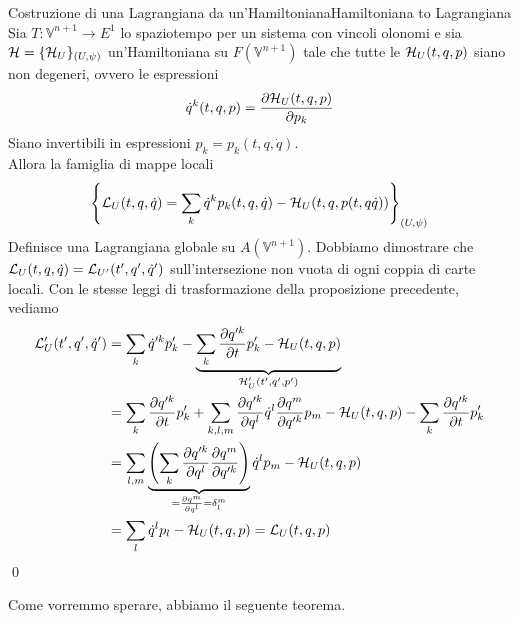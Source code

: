 \documentclass[openany]{book}
\renewcommand\V{\mathbb{V}}
\begin{document}
\begin{proposition}{Costruzione di una Lagrangiana da un'Hamiltoniana}{Hamiltoniana to Lagrangiana}
    Sia $T:\V^{n+1}\to E^1$ lo spaziotempo per un sistema con vincoli olonomi e sia $\mathcal{H} = \{\mathcal{H}_U\}_{(U,\psi)}$ un'Hamiltoniana su $F(\V^{n+1})$ tale che tutte le $\mathcal{H}_U(t,q,p)$ siano non degeneri, ovvero le espressioni 
    \[ \dot q^k(t,q,p) = \frac{\partial \mathcal{H}_U(t,q,p)}{\partial p_k} \]
    Siano invertibili in espressioni $p_k = p_k(t,q,\dot q)$.\\
    Allora la famiglia di mappe locali
    \[ \left\{ \mathcal{L}_U(t,q,\dot q) = \sum_k \dot q^k p_k(t,q,\dot q) - \mathcal{H}_U(t,q,p(t,q\dot q)) \right\}_{(U,\psi)} \]
    Definisce una Lagrangiana globale su $A(\V^{n+1})$.
    \proof 
    Dobbiamo dimostrare che $\mathcal{L}_U(t,q,\dot q) = \mathcal{L}_{U'}(t',q',\dot q')$ sull'intersezione non vuota di ogni coppia di carte locali. Con le stesse leggi di trasformazione della proposizione precedente, vediamo 
    \begin{align*}
        \mathcal{L}_U'(t',q',\dot q') & = \sum_k \dot q'^k p'_k - \underbrace{ \sum_k \frac{\partial q'^k}{\partial t}p'_k - \mathcal{H}_U(t,q,p) }_{\mathcal{H}_U'(t',q',p')} \\
        & = \sum_{k} \frac{\partial q'^k}{\partial t}p'_k + \sum_{k,l,m} \frac{\partial q'^k}{\partial q^l}\dot q^l \frac{\partial q^m}{\partial q'^k} p_m - \mathcal{H}_U(t,q,p) - \sum_k \frac{\partial q'^k}{\partial t}p'_k \\
        & = \sum_{l,m} \underbrace{\left( \sum_k \frac{\partial q'^k}{\partial q^l}\frac{\partial q^m}{\partial q'^k} \right)}_{= \frac{\partial q^m}{\partial q^l} = \delta_l^m }\dot q^l p_m - \mathcal{H}_U(t,q,p) \\
        & = \sum_l \dot q^l p_l - \mathcal{H}_U(t,q,p) = \mathcal{L}_U(t,q,p)
    \end{align*}
    \qed
\end{proposition}

Come vorremmo sperare, abbiamo il seguente teorema.
\end{document}
